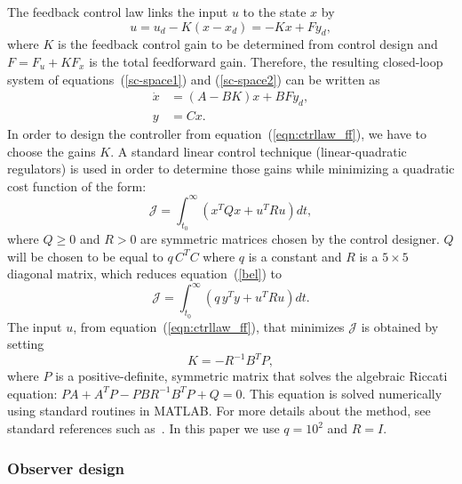 \documentclass[12pt,lot, lof]{puthesis}
\begin{document}
The feedback control law links the input $u$ to the state $x$ by
\begin{equation}
   u = u_{d} - K(x - x_{d}) = - Kx + Fy_{d},
   \label{eqn:ctrllaw_ff}
\end{equation}
where $K$ is the feedback control gain to be determined from control design and $F = F_u + K F_x$ is the total feedforward gain.  Therefore, the resulting closed-loop system of equations~(\ref{sc-space1}) and (\ref{sc-space2}) can be written as
\begin{equation}
\begin{aligned}
      \dot{x} &= (A-BK) x + BF y_{d}, \\
      y &= C x.
\end{aligned}\label{eq:4}
\end{equation}
In order to design the controller from equation~(\ref{eqn:ctrllaw_ff}), we have to choose the gains $K$.
A  standard linear control technique (linear-quadratic regulators) is used in order to determine those gains while minimizing a quadratic cost function of the form:
\begin{equation}
 \mathcal{J} = \int_{t_0}^\infty \left( x^T Q x + u^T R u \right) dt,
 \label{bel}
\end{equation}
where $Q\ge 0$ and $R>0$ are symmetric matrices chosen by the control designer. $Q$ will be chosen to be equal to $q \, C^{T} C$ where $q$ is a constant and $R$ is a $5 \times 5$ diagonal matrix, which reduces equation~(\ref{bel}) to
\begin{equation}
   \mathcal{J} = \int_{t_0}^\infty \left( q \, y^T y + u^T R u \right) dt.
\end{equation}
%
The input $u$, from equation~(\ref{eqn:ctrllaw_ff}), that minimizes $\mathcal{J}$ is obtained by setting
\begin{equation}
   K  = - R^{-1} B^T P,
\end{equation}
where $P$ is a positive-definite, symmetric matrix that solves the algebraic Riccati equation: $P {A} + {A}^T P - P {B} R^{-1} B^T P + Q = 0$.  This equation is solved numerically using standard routines in MATLAB. For more details about the method, see standard references such as~\cite{SandP, AandM}.
%
In this paper we use $q=10^{2}$ and $R=I$.

\subsubsection{Observer design} 
\end{document}
